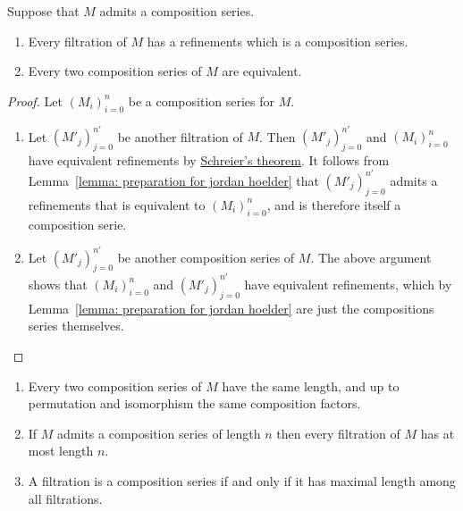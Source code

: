 \begin{theorem}
  \label{theorem: jordan hoelder theorem}
  Suppose that $M$ admits a composition series.
  \begin{enumerate}
    \item
      Every filtration of $M$ has a refinements which is a composition series.
    \item
      Every two composition series of $M$ are equivalent.
  \end{enumerate}
\end{theorem}


\begin{proof}
  Let $(M_i)_{i=0}^n$ be a composition series for $M$.
  \begin{enumerate}
    \item
      Let $(M'_j)_{j=0}^{n'}$ be another filtration of $M$.
      Then $(M'_j)_{j=0}^{n'}$ and $(M_i)_{i=0}^n$ have equivalent refinements by \hyperref[theorem: Schreiers theorem]{Schreier’s theorem}.
      It follows from Lemma~\ref{lemma: preparation for jordan hoelder} that $(M'_j)_{j=0}^{n'}$ admits a refinements that is equivalent to $(M_i)_{i=0}^n$, and is therefore itself a composition serie.
    \item
      Let $(M'_j)_{j=0}^{n'}$ be another composition series of $M$.
      The above argument shows that $(M_i)_{i=0}^n$ and $(M'_j)_{j=0}^{n'}$ have equivalent refinements, which by Lemma~\ref{lemma: preparation for jordan hoelder} are just the compositions series themselves.
    \qedhere
  \end{enumerate}
\end{proof}


\begin{corollary}
  \label{corollary: consequences of jordan hoelder}
  \leavevmode
  \begin{enumerate}
    \item
      \label{enumerate: composition series have same length and factors}
      Every two composition series of $M$ have the same length, and up to permutation and isomorphism the same composition factors.
    \item
      If $M$ admits a composition series of length $n$ then every filtration of $M$ has at most length $n$.
    \item
      A filtration is a composition series if and only if it has maximal length among all filtrations.
  \end{enumerate}
\end{corollary}


